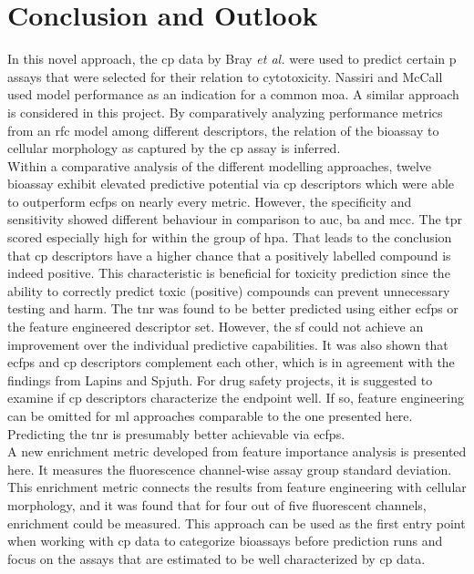 \chapter{Conclusion and Outlook}\label{sec:outlook}
In this novel approach, the \ac{cp} data by Bray \textit{et al.} were used to predict certain \acl{p} assays that were selected for their relation to cytotoxicity. Nassiri and McCall\cite{Nassiri2018} used model performance as an indication for a common \ac{moa}. A similar approach is considered in this project. By comparatively analyzing performance metrics from an \ac{rfc} model among different descriptors, the relation of the bioassay to cellular morphology as captured by the \ac{cp} assay is inferred.\\
Within a comparative analysis of the different modelling approaches, twelve bioassay exhibit elevated predictive potential via \ac{cp} descriptors which were able to outperform \acp{ecfp} on nearly every metric. However, the specificity and sensitivity showed different behaviour in comparison to \ac{auc}, \acl{ba} and \ac{mcc}. The \ac{tpr} scored especially high for within the group of \acl{hpa}. That leads to the conclusion that \ac{cp} descriptors have a higher chance that a positively labelled compound is indeed positive. This characteristic is beneficial for toxicity prediction since the ability to correctly predict toxic (positive) compounds can prevent unnecessary testing and harm. The \ac{tnr} was found to be better predicted using either \acp{ecfp} or the feature engineered descriptor set. However, the \acl{sf} could not achieve an improvement over the individual predictive capabilities. It was also shown that \acp{ecfp} and \ac{cp} descriptors complement each other, which is in agreement with the findings from Lapins and Spjuth\cite{Lapins2019}. For drug safety projects, it is suggested to examine if \ac{cp} descriptors characterize the endpoint well. If so, feature engineering can be omitted for \ac{ml} approaches comparable to the one presented here. Predicting the \ac{tnr} is presumably better achievable via \acp{ecfp}.\\
A new enrichment metric developed from feature importance analysis is presented here. It measures the fluorescence channel-wise assay group standard deviation. This enrichment metric connects the results from feature engineering with cellular morphology, and it was found that for four out of five fluorescent channels, enrichment could be measured. This approach can be used as the first entry point when working with \ac{cp} data to categorize bioassays before prediction runs and focus on the assays that are estimated to be well characterized by \ac{cp} data.
